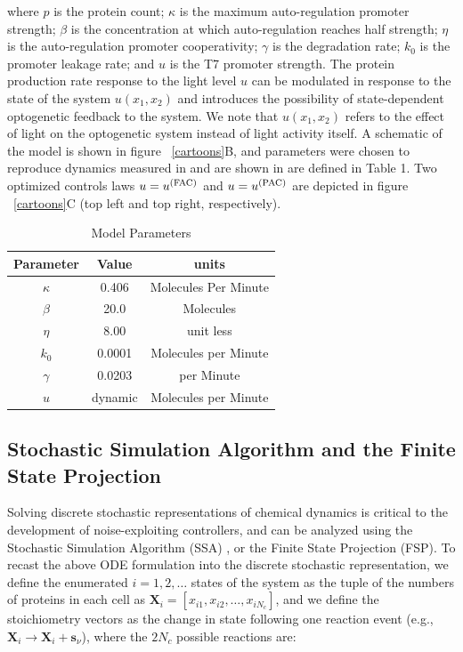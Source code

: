 \documentclass[12pt]{article}
\begin{document}
where $p$ is the protein count; $\kappa$ is the maximum auto-regulation promoter strength; $\beta$ is the concentration at which auto-regulation reaches half strength; $\eta$ is the auto-regulation promoter cooperativity; $\gamma$ is the degradation rate; $k_0$ is the promoter leakage rate; and $u$ is the T7 promoter strength.  The protein production rate response to the light level $u$ can be modulated in response to the state of the system $u(x_1,x_2)$ and introduces the possibility of state-dependent optogenetic feedback to the system.  We note that $u(x_1,x_2)$ refers to the effect of light on the optogenetic system instead of light activity itself. A schematic of the model is shown in figure \ \ref{cartoons}B, and parameters were chosen to reproduce dynamics measured in \cite{Baumschlager2017} and are shown in are defined in Table 1\cite{May2021}. Two optimized controls laws $u=u^{\rm (FAC)}$ and $u=u^{\rm (PAC)}$ are depicted in figure \ \ref{cartoons}C (top left and top right, respectively).


\begin{table}[]
\caption{Model Parameters}
\begin{center}
\begin{tabular}{|c|c|c|}
\hline
Parameter & Value   & units                     \\ \hline
$\kappa$         & 0.406   & Molecules Per Minute \\
$\beta$          & 20.0    & Molecules            \\
$\eta $           & 8.00    & unit less          \\
$k_0$           & 0.0001  & Molecules per Minute \\
$\gamma$         & 0.0203  & per Minute         \\
$u$              & dynamic & Molecules per Minute \\ \hline
\end{tabular}
\label{table}
\end{center}
\vspace{-0.2in}
\end{table}

\subsection{Stochastic Simulation Algorithm and the Finite State Projection}
Solving discrete stochastic representations of chemical dynamics is critical to the development of noise-exploiting controllers, and can be analyzed using the Stochastic Simulation Algorithm (SSA) , or the Finite State Projection (FSP).
To recast the above ODE formulation into the discrete stochastic representation, we define the enumerated $i = 1,2,\ldots$ states of the system as the tuple of the numbers of proteins in each cell as $\mathbf{X}_i = [x_{i1},x_{i2},\ldots,x_{iN_c}]$, and we define the stoichiometry vectors as the change in state following one reaction event (e.g., $\mathbf{X}_i \rightarrow \mathbf{X}_i + \mathbf{s}_\nu$), where the $2N_c$ possible reactions are:
 
\end{document}
